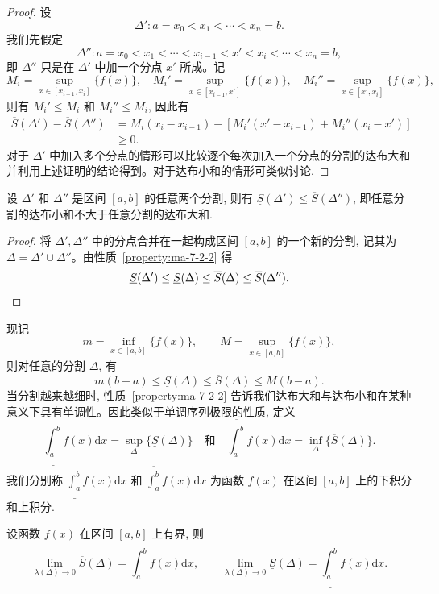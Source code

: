 \begin{proof}
设
\[
  \Delta':a=x_0<x_1<\cdots<x_n=b.
\]
我们先假定
\[
  \Delta'':a=x_0<x_1<\cdots<x_{i-1}<x'<x_i<\cdots<x_n=b,
\]
即 $\Delta''$ 只是在 $\Delta'$ 中加一个分点 $x'$ 所成。记
\[
  M_i=\sup_{x\in[x_{i-1},x_i]}\{f(x)\},\quad
  M_i'=\sup_{x\in[x_{i-1},x']}\{f(x)\},\quad
  M_i''=\sup_{x\in[x',x_i]}\{f(x)\},
\]
则有 $M_i'\leq M_i$ 和 $M_i''\leq M_i$, 因此有
\[
\begin{aligned}
  \overline S(\Delta')-\overline S(\Delta'')
  &=M_i(x_i-x_{i-1})-[M_i'(x'-x_{i-1})+M_i''(x_i-x')]\\
  &\geq0.
\end{aligned}
\]
对于 $\Delta'$ 中加入多个分点的情形可以比较逐个每次加入一个分点的分割的达布大和并利用上述证明的结论得到。对于达布小和的情形可类似讨论.
\end{proof}


\begin{property}\label{property:ma-7-2-3}
设 $\Delta'$ 和 $\Delta''$ 是区间 $[a,b]$ 的任意两个分割, 则有 $\underline S(\Delta')\leq\overline S(\Delta'')$, 即任意分割的达布小和不大于任意分割的达布大和.
\end{property}


\begin{proof}
将 $\Delta',\Delta''$ 中的分点合并在一起构成区间 $[a,b]$ 的一个新的分割, 记其为 $\Delta=\Delta'\cup\Delta''$。由性质~\ref{property:ma-7-2-2} 得
\[
  \underline S(\Delta')\leq \underline S(\Delta)\leq \overline S(\Delta)\leq \overline S(\Delta'').
\qedhere
\]
\end{proof}


现记
\[
  m=\inf_{x\in[a,b]}\{f(x)\},\qquad M=\sup_{x\in[a,b]}\{f(x)\},
\]
则对任意的分割 $\Delta$, 有
\[
  m(b-a)\leq \underline S(\Delta)\leq \overline S(\Delta)\leq M(b-a).
\]
当分割越来越细时, 性质~\ref{property:ma-7-2-2} 告诉我们达布大和与达布小和在某种意义下具有单调性。因此类似于单调序列极限的性质, 定义
\[
  \underline{\int_a^b} f(x)\mathrm dx=\sup_\Delta\{\underline S(\Delta)\}
  \quad\text{和}\quad
  \overline{\int_a^b} f(x)\mathrm dx=\inf_\Delta\{\overline S(\Delta)\}.
\]
我们分别称 $\underline{\int_a^b} f(x)\mathrm dx$ 和 $\overline{\int_a^b} f(x)\mathrm dx$ 为函数 $f(x)$ 在区间 $[a,b]$ 上的下积分和上积分.

\begin{theorem}[{达布定理}]\label{theorem:ma-7-2-4}
设函数 $f(x)$ 在区间 $[a,b]$ 上有界, 则
\[
  \lim_{\lambda(\Delta)\to0}\overline S(\Delta)=\overline{\int_a^b} f(x)\mathrm dx,\qquad
  \lim_{\lambda(\Delta)\to0}\underline S(\Delta)=\underline{\int_a^b} f(x)\mathrm dx.
\]
\end{theorem}


